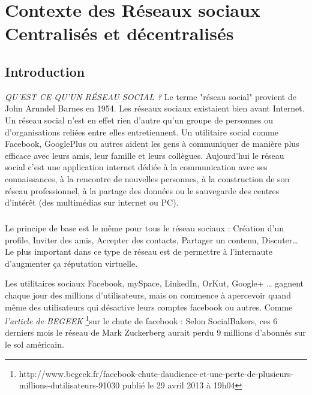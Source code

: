 \chapter{Contexte des Réseaux sociaux Centralisés et décentralisés\\}
\section{Introduction}
\textit{QU'EST CE QU'UN RÉSEAU SOCIAL ?}\newline
Le terme "réseau social" provient de John Arundel Barnes en 1954.
Les réseaux sociaux existaient bien avant Internet. Un réseau social n'est en effet rien d'autre qu'un groupe de personnes ou d'organisations reliées entre elles entretiennent.
Un utilitaire social comme Facebook, GooglePlus ou autres aident les gens à communiquer de manière plus efficace avec leurs amis, leur famille et leurs collègues. 
Aujourd'hui le réseau social c'est une application internet dédiée à la communication avec ses connaissances, à la rencontre de nouvelles personnes, à la construction de son réseau professionnel, à la partage des données ou le sauvegarde des centres d'intérêt (des multimédias sur internet ou PC).
\paragraph{}
Le principe de base est le même pour tous le réseau sociaux :
Création d'un profile, 
Inviter des amis,
Accepter des contacts, 
Partager un contenu,
Discuter…
Le plus important dans ce type de réseau est de permettre à l'internaute d'augmenter ça réputation virtuelle.

Les utilitaires sociaux Facebook, mySpace, LinkedIn, OrKut, Google+ … gagnent chaque jour des millions d'utilisateurs, mais on commence à apercevoir quand même des utilisateurs qui désactive leurs comptes facebook ou autres. Comme \textit{l'article de BEGEEK} \footnote{http://www.begeek.fr/facebook-chute-daudience-et-une-perte-de-plusieurs-millions-dutilisateurs-91030 publié le 29 avril 2013 à 19h04}sur le chute de facebook :
Selon SocialBakers, ces 6 derniers mois le réseau de Mark Zuckerberg aurait perdu 9 millions d’abonnés sur le sol américain.
